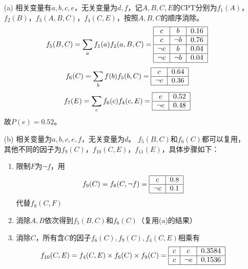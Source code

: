 \documentclass[a4paper, 11pt]{article}
\begin{document}
\begin{answer}
\begin{itemize}
    \item [(a)] 相关变量有$a,b,c,e$，无关变量为$d,f$，记$A,B,C,E$的CPT分别为$f_1(A)$，$f_2(B)$，$f_3(A,B,C)$，$f_4(C,E)$，按照$A,B,C$的顺序消除。
    \[f_5(B,C)=\sum_a f_1(a)f_2(a,B,C)=\text{\begin{tabular}{|c|c|c|}\hline
        $c$ & $b$ & $0.16$\\\hline
        $c$ & $\lnot b$ & $0.76$\\\hline
        $\lnot c$ & $b$ & $0.04$\\\hline
        $\lnot c$ & $\lnot b$ & $0.04$\\\hline
    \end{tabular}}\]
    \[f_6(C)=\sum_b f(b)f_5(b,C)=\text{\begin{tabular}{|c|c|}\hline
        $c$ & $0.64$\\\hline
        $\lnot c$ & $0.36$\\\hline
    \end{tabular}}\]
    \[f_7(E)=\sum_c f_6(c)f_4(c,E)=\text{\begin{tabular}{|c|c|}\hline
        $e$ & $0.52$\\\hline
        $\lnot e$ & $0.48$\\\hline
    \end{tabular}}\]
    故$P(e)=0.52$。
    \item [(b)] 相关变量为$a,b,c,e,f$，无关变量为$d$。
    $f_5(B,C)$和$f_6(C)$都可以复用，其他不同的因子为$f_9(C)$，$f_{10}(C,E)$，$f_{11}(E)$，具体步骤如下：
    \begin{enumerate}
        \item 限制$F$为$\lnot f$，用
        \[f_9(C)=f_8(C,\lnot f)=\text{\begin{tabular}{|c|c|}\hline
            $c$ & $0.8$\\\hline
            $\lnot c$ & $0.1$\\\hline
        \end{tabular}}\]
        代替$f_8(C,F)$
        \item 消除$A,B$依次得到$f_5(B,C)$和$f_6(C)$（复用(a)的结果）
        \item 消除$C$，所有含$C$的因子$f_6(C),f_9(C),f_4(C,E)$相乘有
        \[f_{10}(C,E)=f_4(C,E)\times f_6(C)\times f_9(C)=\text{\begin{tabular}{|c|c|c|}\hline
            $c$ & $e$ & $0.3584$\\\hline
            $c$ & $\lnot e$ & $0.1536$\\\hline

\end{tabular}}\]
\end{enumerate}
\end{itemize}
\end{answer}
\end{document}
